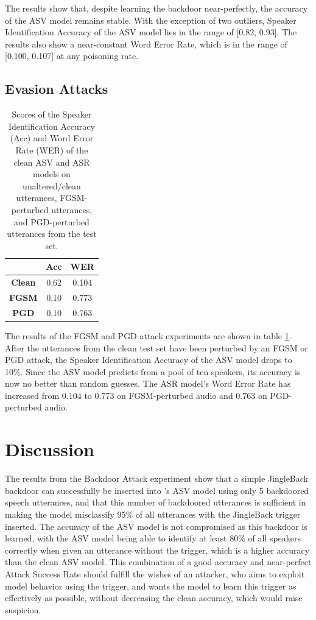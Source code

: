 \documentclass[11pt]{article}
\begin{document}
The results show that, despite learning the backdoor near-perfectly, the accuracy of the ASV model remains stable.
With the exception of two outliers, Speaker Identification Accuracy of the ASV model lies in the range of [0.82, 0.93].
The results also show a near-constant Word Error Rate, which is in the range of [0.100, 0.107] at any poisoning rate.

\subsection{Evasion Attacks}
\begin{table}[h]
    \centering
    \begin{tabular}{c|c|c}
        & \textbf{Acc} & \textbf{WER} \\
        \hline
        \textbf{Clean} & 0.62 & 0.104 \\
        \textbf{FGSM} & 0.10 & 0.773 \\
        \textbf{PGD} & 0.10 & 0.763
    \end{tabular}
    \caption{Scores of the Speaker Identification Accuracy (Acc) and Word Error Rate (WER) of the clean ASV and ASR models on unaltered/clean utterances, FGSM-perturbed utterances, and PGD-perturbed utterances from the test set.}
    \label{tab:evasion_metrics}
\end{table}

The results of the FGSM and PGD attack experiments are shown in table \ref{tab:evasion_metrics}.
After the utterances from the clean test set have been perturbed by an FGSM or PGD attack, the Speaker Identification Accuracy of the ASV model drops to 10\%.
Since the ASV model predicts from a pool of ten speakers, its accuracy is now no better than random guesses.
The ASR model's Word Error Rate has increased from 0.104 to 0.773 on FGSM-perturbed audio and 0.763 on PGD-perturbed audio.

\section{Discussion}
The results from the Backdoor Attack experiment show that a simple JingleBack backdoor can successfully be inserted into \citeauthor{roddeman2024anonymization}'s ASV model using only 5 backdoored speech utterances, and that this number of backdoored utterances is sufficient in making the model misclassify 95\% of all utterances with the JingleBack trigger inserted.
The accuracy of the ASV model is not compromised as this backdoor is learned, with the ASV model being able to identify at least 80\% of all speakers correctly when given an utterance without the trigger, which is a higher accuracy than the clean ASV model.
This combination of a good accuracy and near-perfect Attack Success Rate should fulfill the wishes of an attacker, who aims to exploit model behavior using the trigger, and wants the model to learn this trigger as effectively as possible, without decreasing the clean accuracy, which would raise suspicion.
\end{document}
